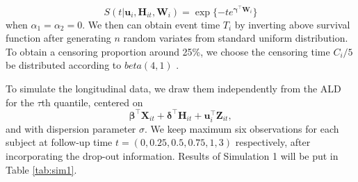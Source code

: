 \[S(t|\boldsymbol{u}_i, {\boldsymbol H}_{it}, {\boldsymbol W}_i) =  \exp\{-te^{\boldsymbol{\gamma}^{\top}\boldsymbol{W}_i}\}\]
when $\alpha_1=\alpha_2=0.$ We then can obtain event time $T_i$ by inverting above survival function after generating $n$ random variates from standard uniform distribution. To obtain a censoring proportion around 25\%, we choose the censoring time $C_i/5$ be distributed according to $beta(4,1)$ . \par

To simulate the longitudinal data, we draw them independently from the ALD for the $\tau$th quantile, centered on 
\[\boldsymbol{\beta}^{\top}{\boldsymbol X}_{it} + \boldsymbol{\delta}^{\top}{\boldsymbol H}_{it} + {\boldsymbol u}_i^{\top}{\boldsymbol Z}_{it},\] and with dispersion parameter $\sigma$. We keep maximum six observations for each subject at follow-up time $t=(0, 0.25, 0.5, 0.75, 1, 3)$ respectively, after incorporating the drop-out information. Results of Simulation 1 will be put in Table \ref{tab:sim1}.



